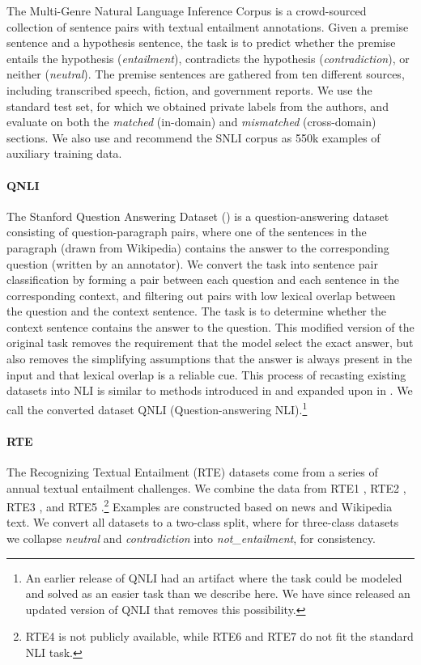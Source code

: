 The Multi-Genre Natural Language Inference Corpus \citep{DBLP:journals/corr/WilliamsNB17} is a crowd-sourced collection of sentence pairs with textual entailment annotations. Given a premise sentence and a hypothesis sentence, the task is to predict whether the premise entails the hypothesis (\textit{entailment}), contradicts the hypothesis (\textit{contradiction}), or neither (\textit{neutral}). The premise sentences are gathered from ten different sources, including transcribed speech, fiction, and government reports. We use the standard test set, for which we obtained private labels from the authors, and evaluate on both the \textit{matched} (in-domain) and \textit{mismatched} (cross-domain) sections. We also use and recommend the SNLI corpus \citep{bowman2015large} as 550k examples of auxiliary training data. 

\paragraph{QNLI}
The Stanford Question Answering Dataset (\citealt{rajpurkar2016squad}) is a question-answering dataset consisting of question-paragraph pairs, where one of the sentences in the paragraph (drawn from Wikipedia) contains the answer to the corresponding question (written by an annotator). We convert the task into sentence pair classification by forming a pair between each question and each sentence in the corresponding context, and filtering out pairs with low lexical overlap between the question and the context sentence. The task is to determine whether the context sentence contains the answer to the question. This modified version of the original task removes the requirement that the model select the exact answer, but also removes the simplifying assumptions that the answer is always present in the input and that lexical overlap is a reliable cue. This process of recasting existing datasets into NLI is similar to methods introduced in \citet{white2017inference} and expanded upon in \citet{demszky2018transforming}.
We call the converted dataset QNLI (Question-answering NLI).\footnote{An earlier release of QNLI had an artifact where the task could be modeled and solved as an easier task than we describe here. We have since released an updated version of QNLI that removes this possibility.}

\paragraph{RTE}
The Recognizing Textual Entailment (RTE) datasets come from a series of annual textual entailment challenges. We combine the data from RTE1 \citep{dagan2006pascal}, RTE2 \citep{bar2006second}, RTE3 \citep{giampiccolo2007third}, and RTE5 \citep{bentivogli2009fifth}.\footnote{RTE4 is not publicly available, while RTE6 and RTE7 do not fit the standard NLI task.} Examples are constructed based on news and Wikipedia text. We convert all datasets to a two-class split, where for three-class datasets we collapse \textit{neutral} and \textit{contradiction} into \textit{not\_entailment}, for consistency.

